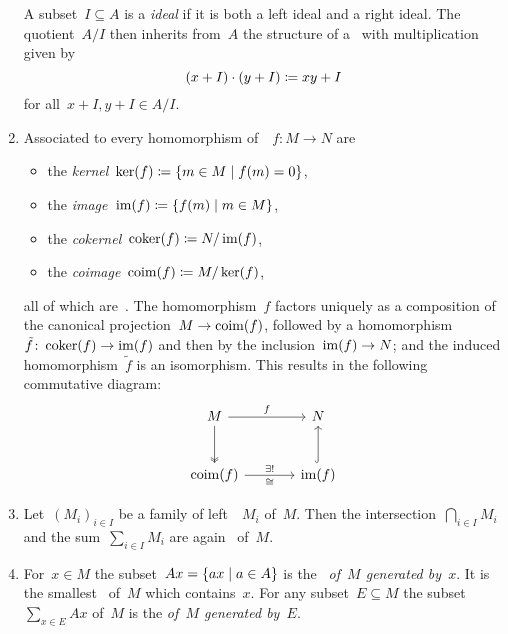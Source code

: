 \begin{remarkdefinition}
\begin{enumerate}
      A subset~$I \subseteq A$ is a \emph{{\twosided} ideal} if it is both a left ideal and a right ideal.
      The quotient~$A/I$ then inherits from~$A$ the structure of a~{\kalg} with multiplication given by
      \[
                  (x + I) \cdot (y + I)
        \coloneqq  xy + I
      \]
      for all~$x + I, y + I \in A/I$.
    \item
      Associated to every homomorphism of~{}~$f \colon M \to N$ are
      \begin{itemize}
        \item
          the \emph{kernel}~$\ker(f) \defined \{m \in M \suchthat f(m) = 0\}$,
        \item
          the \emph{image}~$\im(f) \defined \{f(m) \suchthat m \in M\}$,
        \item
          the \emph{cokernel}~$\operatorname{coker}(f) \coloneqq N/\operatorname{im}(f)$,
        \item
          the \emph{coimage}~$\operatorname{coim}(f) \coloneqq M/\ker(f)$,
      \end{itemize}
      all of which are~{}.
      The homomorphism~$f$ factors uniquely as a composition of the canonical projection~$M \to \operatorname{coim}(f)$, followed by a homomorphism~$\tilde{f} \colon \operatorname{coker}(f) \to \operatorname{im}(f)$ and then by the inclusion~$\operatorname{im}(f) \to N$; and the induced homomorphism~$\tilde{f}$ is an isomorphism.
      This results in the following commutative diagram:
      \[
        \begin{tikzcd}[sep = large]
            M
            \arrow{r}[above]{f}
            \arrow[two heads]{d}
          & N
          \\
            \coim(f)
            \arrow{r}[above]{\exists!}[below]{\cong}
          & \im(f)
            \arrow[hook]{u}
        \end{tikzcd}
      \]
    \item
      Let~$(M_i)_{i \in I}$ be a family of left~{}~$M_i$ of~$M$.
      Then the intersection~$\bigcap_{i \in I} M_i$ and the sum~$\sum_{i \in I} M_i$ are again~{} of~$M$.
    \item
      For~$x \in M$ the subset~$Ax = \{ax \suchthat a \in A\}$ is the~\emph{{} of~$M$ generated by~$x$}.
      It is the smallest~{} of~$M$ which contains~$x$.
      For any subset~$E \subseteq M$ the subset~$\sum_{x \in E} Ax$ of~$M$ is the \emph{{} of~$M$ generated by~$E$}.

\end{enumerate}
\end{remarkdefinition}
